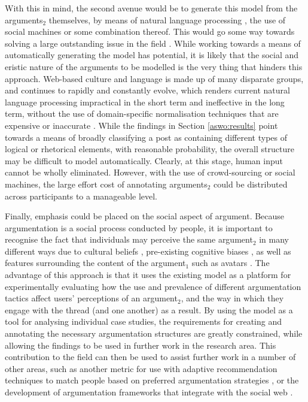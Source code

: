 With this in mind, the second avenue would be to generate this model from the arguments$_2$ themselves, by means of natural language processing \citep{palau2009}, the use of social machines \citep{hendler2010} or some combination thereof. This would go some way towards solving a large outstanding issue in the field \citep[p.~31-32]{Schneider2013}. While working towards a means of automatically generating the model has potential, it is likely that the social and eristic nature of the arguments to be modelled is the very thing that hinders this approach. Web-based culture and language is made up of many disparate groups, and continues to rapidly and constantly evolve, which renders current natural language processing impractical in the short term and ineffective in the long term, without the use of domain-specific normalisation techniques that are expensive or inaccurate \citep{han2011, eisenstein2013}. While the findings in Section \ref{aswo:results} point towards a means of broadly classifying a post as containing different types of logical or rhetorical elements, with reasonable probability, the overall structure may be difficult to model automatically. Clearly, at this stage, human input cannot be wholly eliminated. However, with the use of crowd-sourcing or social machines, the large effort cost of annotating arguments$_2$ could be distributed across participants to a manageable level.

Finally, emphasis could be placed on the social aspect of argument. Because argumentation is a social process conducted by people, it is important to recognise the fact that individuals may perceive the same argument$_2$ in many different ways due to cultural beliefs \citep{suzuki2011}, pre-existing cognitive biases \citep{Arceneaux2012}, as well as features surrounding the content of the argument$_1$ such as avatars \citep{lee2014}. The advantage of this approach is that it uses the existing model as a platform for experimentally evaluating how the use and prevalence of different argumentation tactics affect users' perceptions of an argument$_2$, and the way in which they engage with the thread (and one another) as a result. By using the model as a tool for analysing individual case studies, the requirements for creating and annotating the necessary argumentation structures are greatly constrained, while allowing the findings to be used in further work in the research area. This contribution to the field can then be used to assist further work in a number of other areas, such as another metric for use with adaptive recommendation techniques to match people based on preferred argumentation strategies \citep{guy2010}, or the development of argumentation frameworks that integrate with the social web \citep{torroni2010}.


